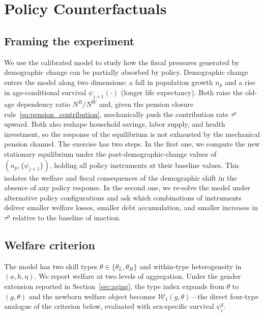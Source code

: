 \documentclass[12pt,a4paper]{article}
\begin{document}
\section{Policy Counterfactuals}
\label{sec:policy}

\subsection{Framing the experiment}
\label{subsec:policy_framing}
 
We use the calibrated model to study how the fiscal pressures generated by demographic change can be partially absorbed by policy. Demographic change enters the model along two dimensions: a fall in population growth $n_p$ and a rise in age-conditional survival $\psi_{j+1}(\cdot)$ (longer life expectancy). Both raise the old-age dependency ratio $N^R/N^W$ and, given the pension closure rule~\eqref{eq:pension_contribution}, mechanically push the contribution rate $\tau^p$ upward. Both also reshape household savings, labor supply, and health investment, so the response of the equilibrium is not exhausted by the mechanical pension channel. The exercise has two steps. In the first one, we compute the new stationary equilibrium under the post-demographic-change values of $(n_p, \{\psi_{j+1}\})$, holding all policy instruments at their baseline values. This isolates the welfare and fiscal consequences of the demographic shift in the absence of any policy response. In the second one, we re-solve the model under alternative policy configurations and ask which combinations of instruments deliver smaller welfare losses, smaller debt accumulation, and smaller increases in $\tau^p$ relative to the baseline of inaction.
 
\subsection{Welfare criterion}
\label{subsec:policy_welfare}
The model has two skill types $\theta \in \{\theta_L, \theta_H\}$ and within-type heterogeneity in $(a, h, \eta)$. We report welfare at two levels of aggregation. Under the gender extension reported in Section~\ref{sec:aging}, the type index expands from $\theta$ to $(g,\theta)$ and the newborn welfare object becomes $\mathcal{W}_1(g,\theta)$---the direct four-type analogue of the criterion below, evaluated with sex-specific survival $\psi^g_i$.
 
\end{document}
